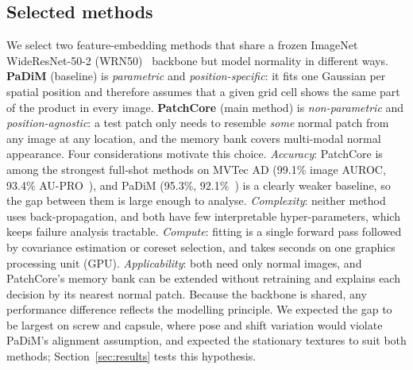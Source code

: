 \subsection{Selected methods}
We select two feature-embedding methods that share a frozen ImageNet WideResNet-50-2 (WRN50)~\cite{zagoruyko2016wrn,deng2009imagenet} backbone but model normality in different ways.
\textbf{PaDiM} (baseline) is \emph{parametric} and \emph{position-specific}: it fits one Gaussian per spatial position and therefore assumes that a given grid cell shows the same part of the product in every image.
\textbf{PatchCore} (main method) is \emph{non-parametric} and \emph{position-agnostic}: a test patch only needs to resemble \emph{some} normal patch from any image at any location, and the memory bank covers multi-modal normal appearance.
Four considerations motivate this choice.
\emph{Accuracy}: PatchCore is among the strongest full-shot methods on MVTec AD (99.1\% image AUROC, 93.4\% AU-PRO~\cite{roth2022patchcore}), and PaDiM (95.3\%, 92.1\%~\cite{defard2021padim}) is a clearly weaker baseline, so the gap between them is large enough to analyse.
\emph{Complexity}: neither method uses back-propagation, and both have few interpretable hyper-parameters, which keeps failure analysis tractable.
\emph{Compute}: fitting is a single forward pass followed by covariance estimation or coreset selection, and takes seconds on one graphics processing unit (GPU).
\emph{Applicability}: both need only normal images, and PatchCore's memory bank can be extended without retraining and explains each decision by its nearest normal patch.
Because the backbone is shared, any performance difference reflects the modelling principle.
We expected the gap to be largest on screw and capsule, where pose and shift variation would violate PaDiM's alignment assumption, and expected the stationary textures to suit both methods; Section~\ref{sec:results} tests this hypothesis.
